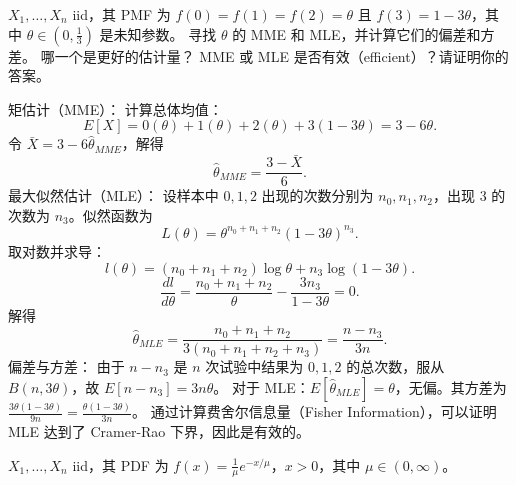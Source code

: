 \begin{questions}
\question $X_1, \dots, X_n$ iid，其 PMF 为 $f(0) = f(1) = f(2) = \theta$ 且 $f(3) = 1 - 3\theta$，其中 $\theta \in (0, \frac{1}{3})$ 是未知参数。
寻找 $\theta$ 的 MME 和 MLE，并计算它们的偏差和方差。
哪一个是更好的估计量？
MME 或 MLE 是否有效（efficient）？请证明你的答案。

\begin{solution}
矩估计（MME）：
计算总体均值：
\[
E[X] = 0(\theta) + 1(\theta) + 2(\theta) + 3(1-3\theta) = 3 - 6\theta.
\]
令 $\bar{X} = 3 - 6\hat{\theta}_{MME}$，解得
\[
\hat{\theta}_{MME} = \frac{3 - \bar{X}}{6}.
\]
最大似然估计（MLE）：
设样本中 $0, 1, 2$ 出现的次数分别为 $n_0, n_1, n_2$，出现 $3$ 的次数为 $n_3$。似然函数为
\[
L(\theta) = \theta^{n_0+n_1+n_2} (1-3\theta)^{n_3}.
\]
取对数并求导：
\[
l(\theta) = (n_0+n_1+n_2)\log\theta + n_3\log(1-3\theta).
\]
\[
\frac{dl}{d\theta} = \frac{n_0+n_1+n_2}{\theta} - \frac{3n_3}{1-3\theta} = 0.
\]
解得
\[
\hat{\theta}_{MLE} = \frac{n_0+n_1+n_2}{3(n_0+n_1+n_2+n_3)} = \frac{n-n_3}{3n}.
\]
偏差与方差：
由于 $n-n_3$ 是 $n$ 次试验中结果为 $0, 1, 2$ 的总次数，服从 $B(n, 3\theta)$，故 $E[n-n_3] = 3n\theta$。
对于 MLE：$E[\hat{\theta}_{MLE}] = \theta$，无偏。其方差为 $\frac{3\theta(1-3\theta)}{9n} = \frac{\theta(1-3\theta)}{3n}$。
通过计算费舍尔信息量（Fisher Information），可以证明 MLE 达到了 Cramer-Rao 下界，因此是有效的。
\end{solution}

\question $X_1, \dots, X_n$ iid，其 PDF 为 $f(x) = \frac{1}{\mu} e^{-x/\mu}$，$x > 0$，其中 $\mu \in (0, \infty)$。
\end{questions}

